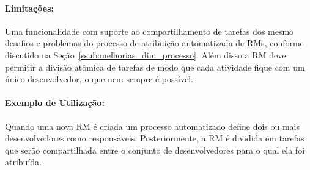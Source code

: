 \paragraph{Limitações:}
\label{par:limitacoes_s08}

Uma funcionalidade com suporte ao compartilhamento de tarefas dos mesmo desafios
e problemas do processo de atribuição automatizada de RMs, conforme discutido na
Seção~\ref{ssub:melhorias_dim_processo}. Além disso a RM deve permitir a divisão
atômica de tarefas de modo que cada atividade fique com um único desenvolvedor,
o que nem sempre é possível.

\paragraph{Exemplo de Utilização:}
\label{par:exemplo_de_utilização_s08}

Quando uma nova RM é criada um processo automatizado define dois ou mais
desenvolvedores como responsáveis. Posteriormente, a RM é dividida em tarefas
que serão compartilhada entre o conjunto de desenvolvedores para o qual ela foi
atribuída.





